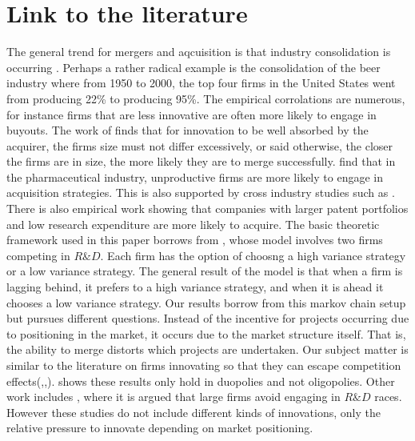\section{Link to the literature}\label{literature}
The general trend for mergers and aqcuisition is that industry consolidation is occurring \citep{white2002trends}. Perhaps a rather radical example is the consolidation of the beer industry where from 1950 to 2000, the top four firms in the United States went from producing 22\% to producing 95\%. The empirical corrolations are numerous, for instance firms that are less innovative are often more likely to engage in buyouts. The work of \cite{Gerpott1995} finds that for innovation to be well absorbed by the acquirer, the firms size must not differ excessively, or said otherwise, the closer the firms are in size, the more likely they are to merge successfully. \cite{Higgins2006} find that in the pharmaceutical industry, unproductive firms are more likely to engage in acquisition strategies. This is also supported by cross industry studies such as \cite{Zhao2009}. There is also empirical work showing that companies with larger patent portfolios and low research expenditure are more likely to acquire\citep{Bena2014}. 
The basic theoretic framework used in this paper borrows from \cite{Cabral2003}, whose model involves two firms competing in $R\&D$. Each firm has the option of choosng a high variance strategy or a low variance strategy. The general result of the model is that when a firm is lagging behind, it prefers to a high variance strategy, and when it is ahead it chooses a low variance strategy. Our results borrow from this markov chain setup but pursues different questions. Instead of the incentive for projects occurring due to positioning in the market, it occurs due to the market structure itself. That is, the ability to merge distorts which projects are undertaken. 
Our subject matter is similar to the literature on firms innovating so that they can escape competition effects(\cite{Aghion2005},\cite{Aghion2001},\cite{Aghion1997}). \cite{Gilbert2016} shows these results only hold in duopolies and not oligopolies. Other work includes \cite{Phillips2012}, where it is argued that large firms avoid engaging in $R\&D$ races. However these studies do not include different kinds of innovations, only the relative pressure to innovate depending on market positioning. 
